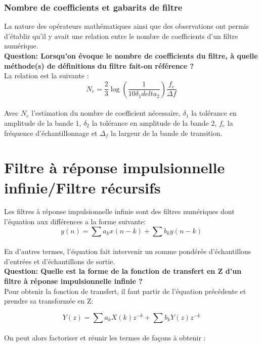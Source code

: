 \documentclass[11pt,a4paper]{article}
\begin{document}
\subsubsection{Nombre de coefficients et gabarits de filtre}
La nature des opérateurs mathématiques ainsi que des observations ont permis d'établir qu'il y avait une relation entre le nombre de coefficients d'un filtre numérique.\\

\textbf{Question: Lorsqu'on évoque le nombre de coefficients du filtre, à quelle méthode(s) de définitions du filtre fait-on référence ?}\\

La relation est la suivante : \\

\[ N_e =  \frac{2}{3}\log(\frac{1}{10 \delta_1 delta_2}) \frac{f_e}{\Delta f}\]\\

Avec $N_e$ l'estimation du nombre de coefficient nécessaire, $\delta_1$ la tolérance en amplitude de la bande 1,  $\delta_2$ la tolérance en amplitude de la bande 2, $f_e$ la fréquence d'échantillonnage et $\Delta_f$ la largeur de la bande de transition.\\ 

 
\section{Filtre à réponse impulsionnelle infinie/Filtre récursifs}
Les filtres à réponse impulsionnelle infinie sont des filtres numériques dont l'équation aux différences a la forme suivante:\\

\[ y(n) = \sum a_k x(n-k) + \sum b_k y(n-k)\]\\


En d'autres termes, l'équation fait intervenir un somme pondérée d'échantillons d'entrées et d'échantillons de sortie.\\

\textbf{Question: Quelle est la forme de la fonction de transfert en Z d'un filtre à réponse impulsionnelle infinie ?}\\

Pour obtenir la fonction de transfert, il faut partir de l'équation précédente et prendre sa transformée en Z:

\[ Y(z)  = \sum a_k X(k)z^{-k} + \sum b_k Y(z)z^{-k}\]  \\

On peut alors factoriser et réunir les termes de façons à obtenir : 
\end{document}
